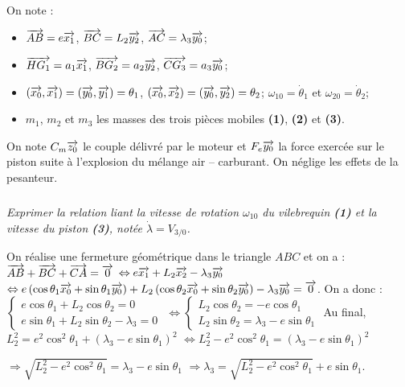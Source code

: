 \documentclass[10pt,fleqn]{article} %
\begin{document}
\begin{multicols}{2}
\begin{center}
\end{center}
\fi
On note : 
\begin{itemize}
\item $\overrightarrow{AB}=e\overrightarrow{x_1}$, $\overrightarrow{BC}=L_2\overrightarrow{y_2}$, $\overrightarrow{AC}=\lambda_3\overrightarrow{y_0}$;
\item $\overrightarrow{HG_1}=a_1\overrightarrow{x_1}$, $\overrightarrow{BG_2}=a_2\overrightarrow{y_2}$, $\overrightarrow{CG_3}=a_3\overrightarrow{y_0}$;
\item $\left(\overrightarrow{x_0},\overrightarrow{x_1}\right)=\left(\overrightarrow{y_0},\overrightarrow{y_1}\right)=\theta_1$, $\left(\overrightarrow{x_0},\overrightarrow{x_2}\right)=\left(\overrightarrow{y_0},\overrightarrow{y_2}\right)=\theta_2$; $\omega_{10}=\dot{\theta}_1$ et $\omega_{20}=\dot{\theta}_2$;
\item $m_1$, $m_2$ et $m_3$ les masses des trois pièces mobiles \textbf{(1)}, \textbf{(2)} et \textbf{(3)}.
\end{itemize}

On note $C_m \overrightarrow{z_0}$ le couple délivré par le moteur et $F_e \overrightarrow{y_0}$ la force exercée sur le piston suite à l'explosion du mélange air -- carburant. On néglige les effets de la pesanteur.

\subparagraph{}
\textit{Exprimer la relation liant la vitesse de rotation $\omega_{10}$ du vilebrequin \textbf{(1)} et la vitesse du piston \textbf{(3)}, notée $\dot{\lambda}=V_{3/0}$.}%

\ifprof
\begin{corrige}
On réalise une fermeture géométrique dans le triangle $ABC$ et on a : 
$\overrightarrow{AB}+\overrightarrow{BC}+\overrightarrow{CA}=\overrightarrow{0}$ $\Leftrightarrow e\overrightarrow{x_1}+L_2\overrightarrow{x_2}-\lambda_3 \overrightarrow{y_0}$ $\Leftrightarrow e\left( \cos \theta_1 \overrightarrow{x_0}+\sin \theta_1 \overrightarrow{y_0} \right)+L_2\left( \cos \theta_2 \overrightarrow{x_0}+\sin \theta_2 \overrightarrow{y_0} \right)-\lambda_3 \overrightarrow{y_0} = \overrightarrow{0}$. 
On a donc : 
$\left\{
\begin{array}{l}
e\cos \theta_1 +L_2 \cos \theta_2 = 0 \\
e\sin \theta_1 + L_2 \sin \theta_2 -\lambda_3 = 0
\end{array}
\right.$
$\Leftrightarrow \left\{
\begin{array}{l}
L_2 \cos \theta_2 = -e\cos \theta_1  \\
L_2 \sin \theta_2  = \lambda_3-e\sin \theta_1
\end{array}
\right.
$
Au final, $L_2^2 = e^2\cos^2 \theta_1 + \left(\lambda_3-e\sin \theta_1\right)^2$
$\Leftrightarrow L_2^2 - e^2\cos^2 \theta_1 = \left(\lambda_3-e\sin \theta_1\right)^2$

$\Rightarrow \sqrt{L_2^2 - e^2\cos^2 \theta_1} = \lambda_3-e\sin \theta_1$
$ \Rightarrow \lambda_3 = \sqrt{L_2^2 - e^2\cos^2 \theta_1}+e\sin \theta_1$.


\end{corrige}
\end{multicols}
\end{document}
